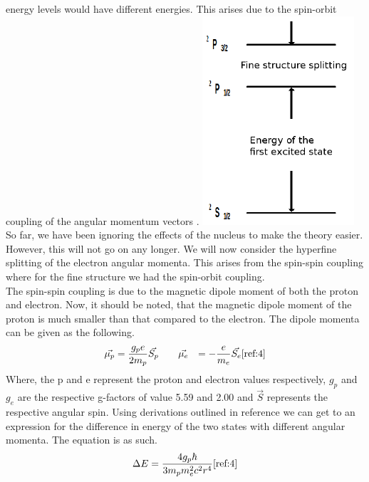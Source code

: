 \documentclass[twocolumn]{article}
\begin{document}
energy levels would have different energies. This arises due to the spin-orbit 
coupling of the angular momentum vectors \cite{ref:4}.
\center
\includegraphics[width=0.5\linewidth]{pictures/energy-levels.png}
\label{fig:2}
\justify
So far, we have been ignoring the effects of the nucleus to make the theory 
easier. However, this will not go on any longer. We will now consider the 
hyperfine splitting of the electron angular momenta. This arises from the 
spin-spin coupling where for the fine structure we had the spin-orbit coupling. 
\\
The spin-spin coupling is due to the magnetic dipole moment of both the proton 
and electron. Now, it should be noted, that the magnetic dipole moment of the 
proton is much smaller than that compared to the electron. The dipole momenta 
can be given as the following.
\begin{equation}
\begin{aligned}
\vec{\mu_p} &= \frac{g_pe}{2m_p}\vec{S_p}
\qquad
\vec{\mu_e} &= -\frac{e}{m_e}\vec{S_e}
\label{eqn:2}
\cite{ref:4}
\end{aligned}
\end{equation}
Where, the p and e represent the proton and electron values respectively, $g_p$ and $g_e$ are the respective g-factors of value 5.59 and 2.00 and $\vec{S}$ 
represents the respective angular spin. Using derivations outlined in reference 
\cite{ref:4} we can get to an expression for the difference in energy of the 
two states with different angular momenta. The equation is as such.
\begin{equation}
\Delta E = \frac{4g_p\hbar}{3m_pm_e^2c^2r^4}
\label{eqn:3}
\cite{ref:4}
\end{equation}
\end{document}
